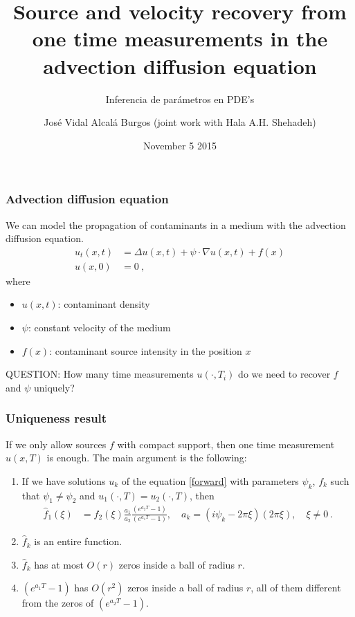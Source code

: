 \documentclass{beamer}
\title[Source and velocity recovery from one time measurements in the advection diffusion equation]{Source and velocity recovery from one time measurements in the advection diffusion equation}
\subtitle{Inferencia de parámetros en PDE's}
\author{José Vidal Alcalá Burgos (joint work with Hala A.H. Shehadeh)}
\institute{Catedrático CONACYT - CIMAT}
\date{November 5 2015}
\begin{document}
\begin{frame}
\titlepage
\end{frame}


\begin{frame} 
\frametitle{Advection diffusion equation}
We can model the propagation of contaminants in a medium with the advection diffusion equation.
\begin{equation}\label{forward}
  \begin{split}
    u_t(x, t) &= \Delta u(x, t) + \psi \cdot \nabla u(x,t) + f(x)\\
    u(x, 0) &= 0\:,
  \end{split}
\end{equation}
where
\begin{itemize}
  \item $u(x,t)$: contaminant density
  \item $\psi$: \alert{constant} velocity of the medium
  \item $f(x)$: contaminant \alert{source} intensity in the position $x$
\end{itemize}

\alert{QUESTION:} How many time measurements $u(\cdot, T_i)$ do we need to recover $f$ and $\psi$ uniquely?
\end{frame}

\begin{frame} 
\frametitle{Uniqueness result}

If we only allow sources $f$ with \alert{compact support}, then \alert{one time} measurement $u(x,T)$ is enough. The main argument is the following:
\begin{enumerate}
  \item If we have solutions $u_k$ of the equation \eqref{forward} with parameters $\psi_k$, $f_k$ such that $\psi_1 \neq \psi_2$ and $u_1(\cdot, T)=u_2(\cdot, T)$, then
    \begin{equation*}
      \begin{split}
        \widehat{f}_{1}(\xi) &= \widehat{f}_2(\xi) \frac{a_1}{a_2}\frac{(e^{a_2 T} - 1)}{(e^{a_1 T} - 1)},\quad
        a_{k} = (i \psi_k - 2 \pi \xi)(2 \pi \xi), \quad \xi\neq 0 \:.
      \end{split}
    \end{equation*}
  \item $\widehat{f}_{k}$ is an \alert{entire} function.
  \item $\widehat{f}_{k}$ has at most \alert{$O(r)$ zeros} inside a ball of radius $r$.
  \item $(e^{a_1 T} - 1)$ has \alert{$O(r^2)$} zeros inside a ball of radius $r$, all of them different from the zeros of $(e^{a_2 T} - 1)$.
\end{enumerate}

\end{frame}
\end{document}

